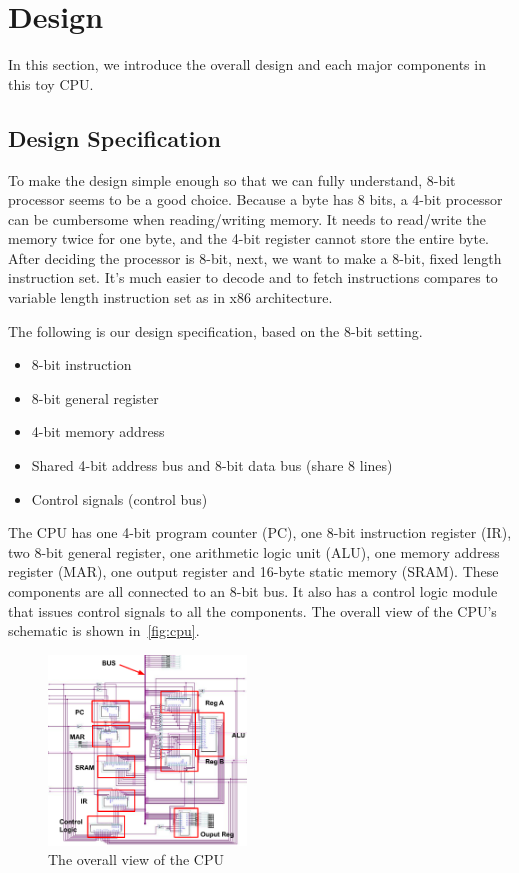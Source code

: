\section{Design}
\label{sec:design}
In this section, we introduce the overall design and each major components in this toy CPU.

\subsection{Design Specification}
To make the design simple enough so that we can fully understand, 8-bit processor seems to be a good choice. Because a byte has 8 bits, a 4-bit processor can be cumbersome when reading/writing memory. It needs to read/write the memory twice for one byte, and the 4-bit register cannot store the entire byte. After deciding the processor is 8-bit, next, we want to make a 8-bit, fixed length instruction set. It's much easier to decode and to fetch instructions compares to variable length instruction set as in x86 architecture.

The following is our design specification, based on the 8-bit setting.

\begin{itemize}
	\item 8-bit instruction
	\item 8-bit general register
	\item 4-bit memory address
	\item Shared 4-bit address bus and 8-bit data bus (share 8 lines)
	\item Control signals (control bus)
\end{itemize}

The CPU has one 4-bit program counter (PC), one 8-bit instruction register (IR), two 8-bit general register, one arithmetic logic unit (ALU), one memory address register (MAR), one output register and 16-byte static memory (SRAM). These components are all connected to an 8-bit bus. It also has a control logic module that issues control signals to all the components. The overall view of the CPU's schematic is shown in~\autoref{fig:cpu}.  

\begin{figure}[th]
	\includegraphics[width=0.47\textwidth]{figures/cpu}
	\centering
	\caption{The overall view of the CPU}
	\label{fig:cpu}
\end{figure}


